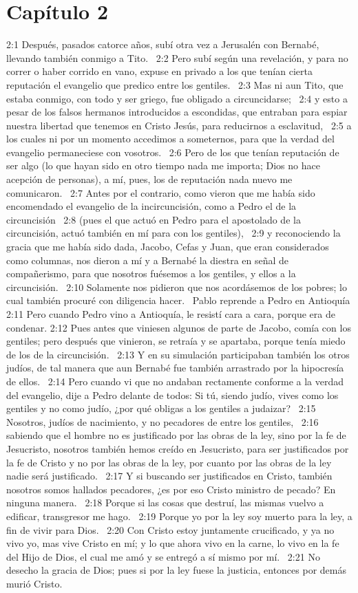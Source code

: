 \section*{Capítulo 2}

2:1 Después, pasados catorce años, subí otra vez a Jerusalén con Bernabé, llevando también conmigo a Tito.  
2:2 Pero subí según una revelación, y para no correr o haber corrido en vano, expuse en privado a los que tenían cierta reputación el evangelio que predico entre los gentiles.  
2:3 Mas ni aun Tito, que estaba conmigo, con todo y ser griego, fue obligado a circuncidarse;  
2:4 y esto a pesar de los falsos hermanos introducidos a escondidas, que entraban para espiar nuestra libertad que tenemos en Cristo Jesús, para reducirnos a esclavitud,  
2:5 a los cuales ni por un momento accedimos a someternos, para que la verdad del evangelio permaneciese con vosotros.  
2:6 Pero de los que tenían reputación de ser algo (lo que hayan sido en otro tiempo nada me importa; Dios no hace acepción de personas), a mí, pues, los de reputación nada nuevo me comunicaron.  
2:7 Antes por el contrario, como vieron que me había sido encomendado el evangelio de la incircuncisión, como a Pedro el de la circuncisión  
2:8 (pues el que actuó en Pedro para el apostolado de la circuncisión, actuó también en mí para con los gentiles),  
2:9 y reconociendo la gracia que me había sido dada, Jacobo, Cefas y Juan, que eran considerados como columnas, nos dieron a mí y a Bernabé la diestra en señal de compañerismo, para que nosotros fuésemos a los gentiles, y ellos a la circuncisión.  
2:10 Solamente nos pidieron que nos acordásemos de los pobres; lo cual también procuré con diligencia hacer.  
Pablo reprende a Pedro en Antioquía 
2:11 Pero cuando Pedro vino a Antioquía, le resistí cara a cara, porque era de condenar. 
2:12 Pues antes que viniesen algunos de parte de Jacobo, comía con los gentiles; pero después que vinieron, se retraía y se apartaba, porque tenía miedo de los de la circuncisión.  
2:13 Y en su simulación participaban también los otros judíos, de tal manera que aun Bernabé fue también arrastrado por la hipocresía de ellos.  
2:14 Pero cuando vi que no andaban rectamente conforme a la verdad del evangelio, dije a Pedro delante de todos: Si tú, siendo judío, vives como los gentiles y no como judío, ¿por qué obligas a los gentiles a judaizar?  
2:15 Nosotros, judíos de nacimiento, y no pecadores de entre los gentiles,  
2:16 sabiendo que el hombre no es justificado por las obras de la ley, sino por la fe de Jesucristo, nosotros también hemos creído en Jesucristo, para ser justificados por la fe de Cristo y no por las obras de la ley, por cuanto por las obras de la ley nadie será justificado.  
2:17 Y si buscando ser justificados en Cristo, también nosotros somos hallados pecadores, ¿es por eso Cristo ministro de pecado? En ninguna manera.  
2:18 Porque si las cosas que destruí, las mismas vuelvo a edificar, transgresor me hago.  
2:19 Porque yo por la ley soy muerto para la ley, a fin de vivir para Dios.  
2:20 Con Cristo estoy juntamente crucificado, y ya no vivo yo, mas vive Cristo en mí; y lo que ahora vivo en la carne, lo vivo en la fe del Hijo de Dios, el cual me amó y se entregó a sí mismo por mí.  
2:21 No desecho la gracia de Dios; pues si por la ley fuese la justicia, entonces por demás murió Cristo.  
